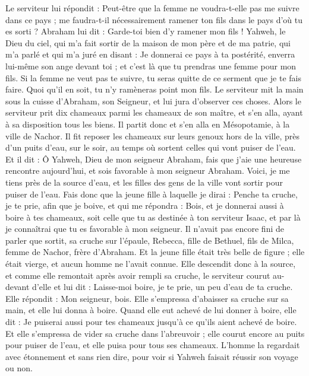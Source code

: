 \begin{multicols}{2}
Le serviteur lui répondit : Peut-être que la femme ne voudra-t-elle pas me suivre dans ce pays ; me faudra-t-il nécessairement ramener ton fils dans le pays d'où tu es sorti ?
Abraham lui dit : Garde-toi bien d'y ramener mon fils !
Yahweh, le Dieu du ciel, qui m'a fait sortir de la maison de mon père et de ma patrie, qui m'a parlé et qui m'a juré en disant : Je donnerai ce pays à ta postérité, enverra lui-même son ange devant toi ; et c'est là que tu prendras une femme pour mon fils.
Si la femme ne veut pas te suivre, tu seras quitte de ce serment que je te fais faire. Quoi qu'il en soit, tu n'y ramèneras point mon fils.
Le serviteur mit la main sous la cuisse d'Abraham, son Seigneur, et lui jura d'observer ces choses.
Alors le serviteur prit dix chameaux parmi les chameaux de son maître, et s'en alla, ayant à sa disposition tous les biens. Il partit donc et s'en alla en Mésopotamie, à la ville de Nachor.
Il fit reposer les chameaux sur leurs genoux hors de la ville, près d'un puits d'eau, sur le soir, au temps où sortent celles qui vont puiser de l'eau.
Et il dit : Ô Yahweh, Dieu de mon seigneur Abraham, fais que j'aie une heureuse rencontre aujourd'hui, et sois favorable à mon seigneur Abraham.
Voici, je me tiens près de la source d'eau, et les filles des gens de la ville vont sortir pour puiser de l'eau.
Fais donc que la jeune fille à laquelle je dirai : Penche ta cruche, je te prie, afin que je boive, et qui me répondra : Bois, et je donnerai aussi à boire à tes chameaux, soit celle que tu as destinée à ton serviteur Isaac, et par là je connaîtrai que tu es favorable à mon seigneur.
Il n'avait pas encore fini de parler que sortit, sa cruche sur l'épaule, Rebecca, fille de Bethuel, fils de Milca, femme de Nachor, frère d'Abraham.
Et la jeune fille était très belle de figure ; elle était vierge, et aucun homme ne l'avait connue. Elle descendit donc à la source, et comme elle remontait après avoir rempli sa cruche,
le serviteur courut au-devant d'elle et lui dit : Laisse-moi boire, je te prie, un peu d'eau de ta cruche.
Elle répondit : Mon seigneur, bois. Elle s'empressa d'abaisser sa cruche sur sa main, et elle lui donna à boire.
Quand elle eut achevé de lui donner à boire, elle dit : Je puiserai aussi pour tes chameaux jusqu'à ce qu'ils aient achevé de boire.
Et elle s'empressa de vider sa cruche dans l'abreuvoir ; elle courut encore au puits pour puiser de l'eau, et elle puisa pour tous ses chameaux.
L'homme la regardait avec étonnement et sans rien dire, pour voir si Yahweh faisait réussir son voyage ou non.

\end{multicols}
